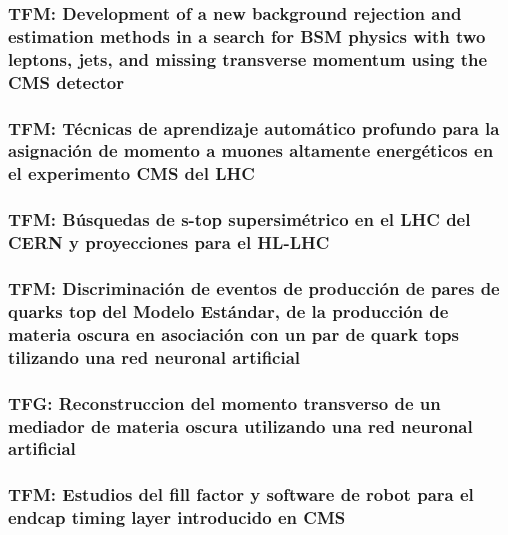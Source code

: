 \documentclass[a4paper, 11pt, twoside, openright]{report}
\begin{document}
\subsubsection{TFM: Development of a new background rejection and estimation methods in a search for BSM physics with two leptons, jets, and missing transverse momentum using the CMS detector}


\subsubsection{TFM: Técnicas de aprendizaje automático profundo para la asignación de momento a muones altamente energéticos en el experimento CMS del LHC}


\subsubsection{TFM: Búsquedas de s-top supersimétrico en el LHC del CERN y proyecciones para el HL-LHC}


\subsubsection{TFM: Discriminación de eventos de producción de pares de quarks top del Modelo Estándar, de la producción de materia oscura en asociación con un par de quark tops tilizando una red neuronal artificial}


\subsubsection{TFG: Reconstruccion del momento transverso de un mediador de materia oscura utilizando una red neuronal artificial}


\subsubsection{TFM: Estudios del fill factor y software de robot para el endcap timing layer introducido en CMS}

\end{document}
